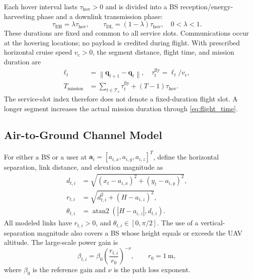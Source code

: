 \documentclass[conference]{IEEEtran}
\newcommand{\EH}{\mathrm{EH}}
\newcommand{\DL}{\mathrm{DL}}
\newcommand{\fly}{\mathrm{fly}}
\newcommand{\hov}{\mathrm{hov}}
\newcommand{\setT}{\mathcal{T}_{\mathrm{s}}}
\newcommand{\norm}[1]{\left\lVert #1\right\rVert}
\begin{document}
Each hover interval lasts $\tau_{\hov}>0$ and is divided into a BS reception/energy-harvesting phase and a downlink transmission phase:
\begin{equation}
\tau_{\EH}=\lambda\tau_{\hov},\qquad
\tau_{\DL}=(1-\lambda)\tau_{\hov},\quad 0<\lambda<1.
\label{eq:phase_times}
\end{equation}
These durations are fixed and common to all service slots. Communications occur at the hovering locations; no payload is credited during flight. With prescribed horizontal cruise speed $v_{\mathrm c}>0$, the segment distance, flight time, and mission duration are
\begin{align}
\ell_t&=\norm{\bm q_{t+1}-\bm q_t},\quad
\tau_t^{\fly}=\ell_t/v_{\mathrm c},\label{eq:flight_time}\\
T_{\mathrm{mission}}&=\sum_{t\in\setT}\tau_t^{\fly}
+(T-1)\tau_{\hov}.\label{eq:mission_time}
\end{align}
The service-slot index therefore does not denote a fixed-duration flight slot. A longer segment increases the actual mission duration through \cref{eq:flight_time}.

\subsection{Air-to-Ground Channel Model}
\label{subsec:channel_assumptions}
For either a BS or a user at $\bm a_i=[a_{i,x},a_{i,y},a_{i,z}]^T$, define the horizontal separation, link distance, and elevation magnitude as
\begin{align}
d_{t,i}&=\sqrt{(x_t-a_{i,x})^2+(y_t-a_{i,y})^2},\nonumber\\
r_{t,i}&=\sqrt{d_{t,i}^2+(H-a_{i,z})^2},\nonumber\\
\theta_{t,i}&=\operatorname{atan2}(|H-a_{i,z}|,d_{t,i}).
\label{eq:distances}
\end{align}
All modeled links have $r_{t,i}>0$, and $\theta_{t,i}\in[0,\pi/2]$. The use of a vertical-separation magnitude also covers a BS whose height equals or exceeds the UAV altitude. The large-scale power gain is
\begin{equation}
\beta_{t,i}=\beta_0\left(\frac{r_{t,i}}{r_0}\right)^{-\nu},
\qquad r_0=1\ \mathrm m,
\label{eq:path_loss}
\end{equation}
where $\beta_0$ is the reference gain and $\nu$ is the path loss exponent.
\end{document}
